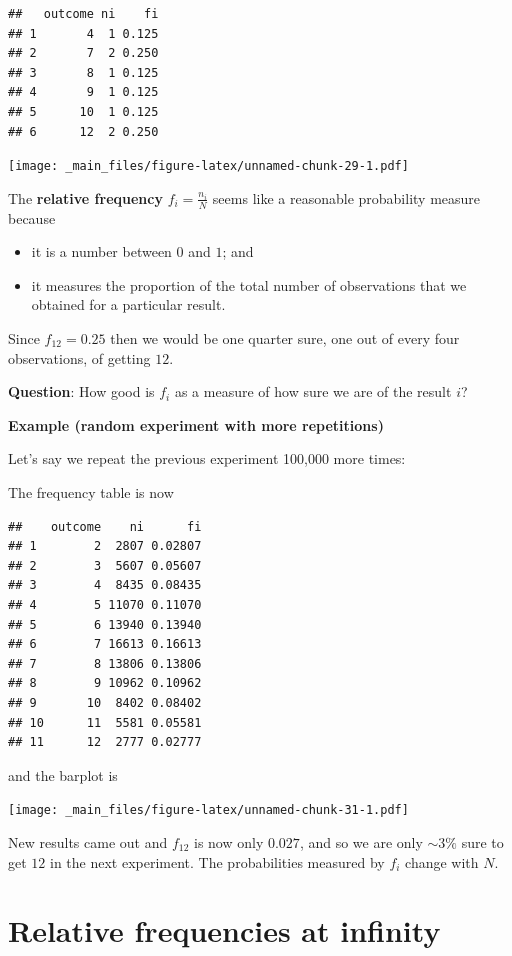 \documentclass[
]{book}
\providecommand{\tightlist}{%
  \setlength{\itemsep}{0pt}\setlength{\parskip}{0pt}}
\begin{document}
\begin{verbatim}
##   outcome ni    fi
## 1       4  1 0.125
## 2       7  2 0.250
## 3       8  1 0.125
## 4       9  1 0.125
## 5      10  1 0.125
## 6      12  2 0.250
\end{verbatim}

\texttt{[image: \_main\_files/figure-latex/unnamed-chunk-29-1.pdf]}

The \textbf{relative frequency} \(f_i =\frac{ n_ i}{ N}\) seems like a reasonable probability measure because

\begin{itemize}
\tightlist
\item
  it is a number between \(0\) and \(1\); and
\item
  it measures the proportion of the total number of observations that we obtained for a particular result.
\end{itemize}

Since \(f_{12}=0.25\) then we would be one quarter sure, one out of every four observations, of getting \(12\).

\textbf{Question}: How good is \(f_i\) as a measure of how sure we are of the result \(i\)?

\textbf{Example (random experiment with more repetitions)}

Let's say we repeat the previous experiment 100,000 more times:

The frequency table is now

\begin{verbatim}
##    outcome    ni      fi
## 1        2  2807 0.02807
## 2        3  5607 0.05607
## 3        4  8435 0.08435
## 4        5 11070 0.11070
## 5        6 13940 0.13940
## 6        7 16613 0.16613
## 7        8 13806 0.13806
## 8        9 10962 0.10962
## 9       10  8402 0.08402
## 10      11  5581 0.05581
## 11      12  2777 0.02777
\end{verbatim}

and the barplot is

\texttt{[image: \_main\_files/figure-latex/unnamed-chunk-31-1.pdf]}

New results came out and \(f_{12}\) is now only \(0.027\), and so we are only \(\sim 3\%\) sure to get \(12\) in the next experiment. The probabilities measured by \(f_i\) change with \(N\).

\hypertarget{relative-frequencies-at-infinity}{%
\section{Relative frequencies at infinity}\label{relative-frequencies-at-infinity}}
\end{document}
